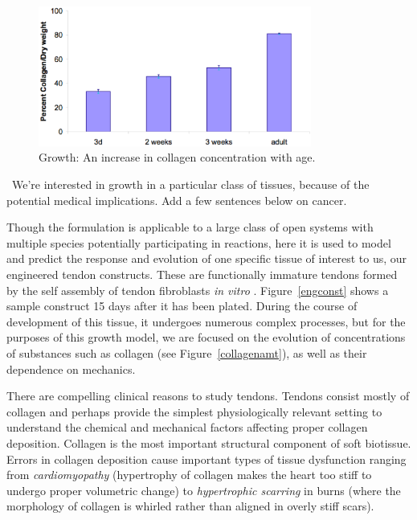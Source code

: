 \begin{figure}[!hpt]
\centering
\includegraphics[width=0.8\textwidth]
                {images/experiments/content-evolution} 
\caption{Growth: An increase in collagen concentration with age.}
\label{content-evolution}
\end{figure}

\textbullet\ We're interested in growth in a particular class of tissues, because
of the potential medical implications. Add a few sentences below on
cancer.

Though the formulation is applicable to a large class of open systems
with multiple species potentially participating in reactions, here it is
used to model and predict the response and evolution of one specific
tissue of interest to us, our engineered tendon constructs. These are
functionally immature tendons formed by the self assembly of tendon
fibroblasts {\sl in vitro} \cite{Calve:04}. \mbox{Figure \ref{engconst}}
shows a sample construct 15 days after it has been plated. During the
course of development of this tissue, it undergoes numerous complex
processes, but for the purposes of this growth model, we are focused
on the evolution of concentrations of substances such as collagen (see
\mbox{Figure \ref{collagenamt}}), as well as their dependence on
mechanics. 

There are compelling clinical reasons to study tendons. Tendons
consist mostly of collagen and perhaps provide the simplest
physiologically relevant setting to understand the chemical and
mechanical factors affecting proper collagen deposition. Collagen is
the most important structural component of soft biotissue. Errors in 
collagen deposition cause important types of tissue dysfunction
ranging from {\sl cardiomyopathy} (hypertrophy of collagen makes the
heart too stiff to undergo proper volumetric change) to {\sl
  hypertrophic scarring} in burns (where the morphology of collagen is
whirled rather than aligned in overly stiff scars).

